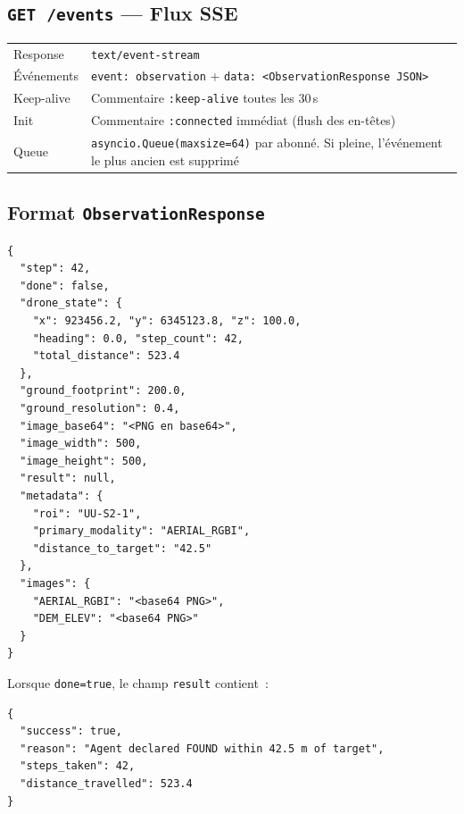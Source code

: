 \documentclass[a4paper, 11pt, french]{article}
\newcommand{\code}[1]{\texttt{#1}}
\newcommand{\apiendpoint}[2]{\texorpdfstring{\texttt{#1}~\texttt{#2}}{#1 #2}}
\begin{document}
\subsection{\apiendpoint{GET}{/events} --- Flux SSE}
\label{sec:sse}

\begin{table}[H]
\centering\small
\begin{tabular}{lp{10cm}}
\toprule
Response & \code{text/event-stream} \\
Événements & \code{event: observation} + \code{data: <ObservationResponse JSON>} \\
Keep-alive & Commentaire \code{:keep-alive} toutes les 30\,s \\
Init & Commentaire \code{:connected} immédiat (flush des en-têtes) \\
Queue & \code{asyncio.Queue(maxsize=64)} par abonné. Si pleine, l'événement
        le plus ancien est supprimé \\
\bottomrule
\end{tabular}
\end{table}

\subsection{Format \code{ObservationResponse}}
\label{sec:obs-format}

\begin{lstlisting}[style=json, caption={Structure complète d'une ObservationResponse}]
{
  "step": 42,
  "done": false,
  "drone_state": {
    "x": 923456.2, "y": 6345123.8, "z": 100.0,
    "heading": 0.0, "step_count": 42,
    "total_distance": 523.4
  },
  "ground_footprint": 200.0,
  "ground_resolution": 0.4,
  "image_base64": "<PNG en base64>",
  "image_width": 500,
  "image_height": 500,
  "result": null,
  "metadata": {
    "roi": "UU-S2-1",
    "primary_modality": "AERIAL_RGBI",
    "distance_to_target": "42.5"
  },
  "images": {
    "AERIAL_RGBI": "<base64 PNG>",
    "DEM_ELEV": "<base64 PNG>"
  }
}
\end{lstlisting}

Lorsque \code{done=true}, le champ \code{result} contient~:
\begin{lstlisting}[style=json]
{
  "success": true,
  "reason": "Agent declared FOUND within 42.5 m of target",
  "steps_taken": 42,
  "distance_travelled": 523.4
}
\end{lstlisting}

\end{document}
